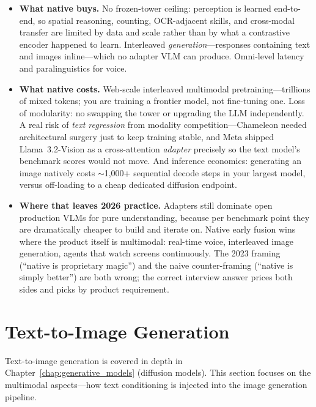 \begin{itemize}
    \item \textbf{What native buys.} No frozen-tower ceiling: perception is learned end-to-end, so spatial reasoning, counting, OCR-adjacent skills, and cross-modal transfer are limited by data and scale rather than by what a contrastive encoder happened to learn. Interleaved \textit{generation}---responses containing text and images inline---which no adapter VLM can produce. Omni-level latency and paralinguistics for voice.
    \item \textbf{What native costs.} Web-scale interleaved multimodal pretraining---trillions of mixed tokens; you are training a frontier model, not fine-tuning one. Loss of modularity: no swapping the tower or upgrading the LLM independently. A real risk of \textit{text regression} from modality competition---Chameleon needed architectural surgery just to keep training stable, and Meta shipped Llama~3.2-Vision as a cross-attention \textit{adapter} precisely so the text model's benchmark scores would not move. And inference economics: generating an image natively costs $\sim$1{,}000+ sequential decode steps in your largest model, versus off-loading to a cheap dedicated diffusion endpoint.
    \item \textbf{Where that leaves 2026 practice.} Adapters still dominate open production VLMs for pure understanding, because per benchmark point they are dramatically cheaper to build and iterate on. Native early fusion wins where the product itself is multimodal: real-time voice, interleaved image generation, agents that watch screens continuously. The 2023 framing (``native is proprietary magic'') and the naive counter-framing (``native is simply better'') are both wrong; the correct interview answer prices both sides and picks by product requirement.
\end{itemize}

\section{Text-to-Image Generation}
\label{sec:text_to_image}

Text-to-image generation is covered in depth in Chapter~\ref{chap:generative_models} (diffusion models). This section focuses on the multimodal aspects---how text conditioning is injected into the image generation pipeline.

